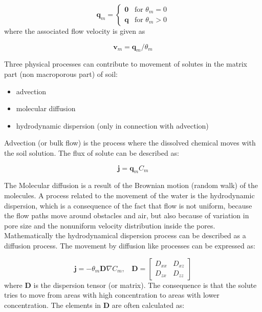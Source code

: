 \documentclass{report}
\begin{document}
\begin{equation}
\mathbf{q}_{m} =
\begin{cases}
\mathbf{0} & \text{for\ } \theta_{m} = 0 \\
\mathbf{q} & \text{for\ } \theta_{m} > 0
\end{cases}
\end{equation}
%
where the associated flow velocity is given as

\begin{equation}
\mathbf{v}_{m}=\mathbf{q}_{m}/\theta_{m}
\end{equation}

Three physical processes can contribute to movement of solutes in
the matrix part (non macroporous part) of soil:

\begin{itemize}
\item advection
\item molecular diffusion
\item hydrodynamic dispersion (only in connection
  with advection)
\end{itemize}

Advection (or bulk flow) is the
process where the dissolved chemical moves with the soil solution.
The flux of solute can be described as:

\begin{equation}
\mathbf{j}=\mathbf{q}_{m}C_{m}
\end{equation}

The Molecular diffusion is a result of the Brownian
motion (random walk) of the molecules. A process related to the movement of the
water is the hydrodynamic dispersion, which is a consequence of the
fact that flow is not uniform, because the flow paths move around
obstacles and air, but also because of variation in pore size and
the nonuniform velocity distribution inside the pores.
Mathematically the hydrodynamical dispersion process can be
described as a diffusion process. The movement by diffusion like
processes can be expressed as:

\begin{equation}
\mathbf{j}=-\theta_m \mathbf{D}\nabla C_{m}, \ \ \ \
\mathbf{D}=\begin{bmatrix}
D_{xx} & D_{xz}\\
D_{zx} & D_{zz}
\end{bmatrix}
\end{equation}
%
where $\mathbf{D}$ is the dispersion tensor
(or matrix). The consequence is that the solute tries to move from
areas with high concentration to areas with lower concentration. The
elements in $\mathbf{D}$ are often calculated as:
\end{document}

